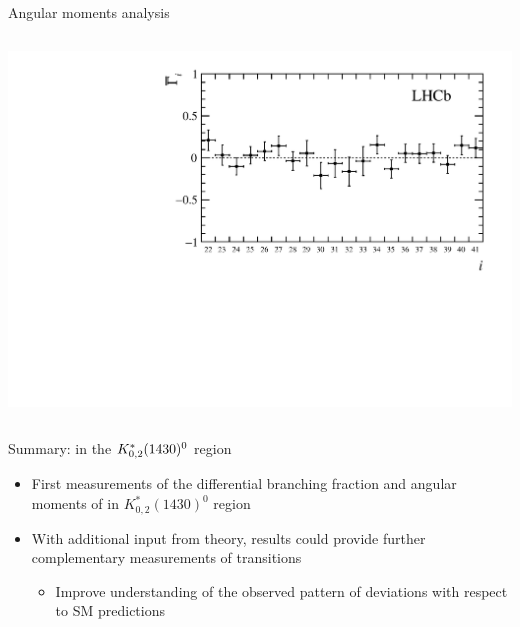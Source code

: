 \documentclass[aspectratio=1610]{beamer}
\def\Kstarfourteenthirty  {{\ensuremath{\kaon^{*}_{0,2}(1430)^{0}}}\xspace}
\begin{document}
\begin{frame}{Angular moments analysis}
\begin{columns}
\begin{column}{0.45\textwidth}
\includegraphics[height=0.44\textheight]{figs/kpimm/angular-analysis/mom_results_22_41.pdf}
\end{column}
\end{columns}
\end{frame}

\begin{frame}{Summary: \BdToKpimm in the \Kstarfourteenthirty region}

\begin{itemize}
  \item[\ding{80}] First measurements of the differential branching fraction and angular moments of \BdToKpimm in $K^{*}_{0,2}(1430)^{0}$ region
  \item[\ding{80}] With additional input from theory, results could provide further complementary measurements of \btosll transitions
  \begin{itemize}
    \item[\ding{70}] Improve understanding of the observed pattern of deviations with respect to SM predictions
  \end{itemize}
\end{itemize}

\end{frame}


\appendix
\end{document}
